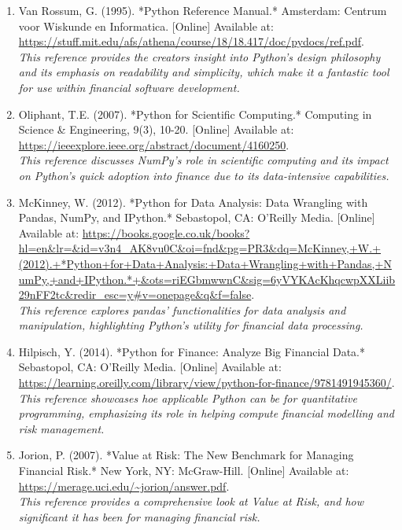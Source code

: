 \documentclass{article}
\begin{document}
\begin{small}
  \begin{enumerate}

    \item\label{ref19} Van Rossum, G. (1995). *Python Reference Manual.* Amsterdam: Centrum voor Wiskunde en Informatica. [Online] Available at: \url{https://stuff.mit.edu/afs/athena/course/18/18.417/doc/pydocs/ref.pdf}.
    \\\textit{This reference provides the creators insight into Python's design philosophy and its emphasis on readability and simplicity, which make it a fantastic tool for use within financial software development.}

    \item\label{ref20} Oliphant, T.E. (2007). *Python for Scientific Computing.* Computing in Science \& Engineering, 9(3), 10-20. [Online] Available at: \url{https://ieeexplore.ieee.org/abstract/document/4160250}.
    \\\textit{This reference discusses NumPy's role in scientific computing and its impact on Python's quick adoption into finance due to its data-intensive capabilities.}

    \item\label{ref21} McKinney, W. (2012). *Python for Data Analysis: Data Wrangling with Pandas, NumPy, and IPython.* Sebastopol, CA: O'Reilly Media. [Online] Available at: \url{https://books.google.co.uk/books?hl=en&lr=&id=v3n4_AK8vu0C&oi=fnd&pg=PR3&dq=McKinney,+W.+(2012).+*Python+for+Data+Analysis:+Data+Wrangling+with+Pandas,+NumPy,+and+IPython.*+&ots=riEGbmwwnC&sig=6yVYKAcKhqcwpXXLiib29nFF2tc&redir_esc=y#v=onepage&q&f=false}.
    \\\textit{This reference explores pandas' functionalities for data analysis and manipulation, highlighting Python's utility for financial data processing.}

    \item\label{ref22} Hilpisch, Y. (2014). *Python for Finance: Analyze Big Financial Data.* Sebastopol, CA: O'Reilly Media. [Online] Available at: \url{https://learning.oreilly.com/library/view/python-for-finance/9781491945360/}.
    \\\textit{This reference showcases hoe applicable Python can be for quantitative programming, emphasizing its role in helping compute financial modelling and risk management.}

    \item\label{ref23} Jorion, P. (2007). *Value at Risk: The New Benchmark for Managing Financial Risk.* New York, NY: McGraw-Hill. [Online] Available at: \url{https://merage.uci.edu/~jorion/answer.pdf}.
    \\\textit{This reference provides a comprehensive look at Value at Risk, and how significant it has been for managing financial risk.}

  \end{enumerate}
\end{small}
\end{document}
